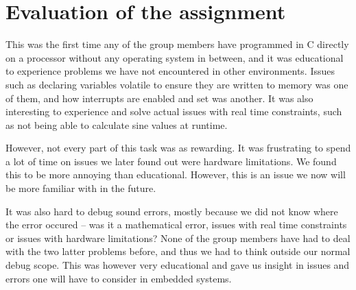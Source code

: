 \section{Evaluation of the assignment}

This was the first time any of the group members have programmed in C
directly on a processor without any operating system in between, and it
was educational to experience problems we have not encountered in other
environments.  Issues such as declaring variables volatile to ensure they
are written to memory was one of them, and how interrupts are enabled
and set was another. It was also interesting to experience and solve
actual issues with real time constraints, such as not being able to
calculate sine values at runtime.

However, not every part of this task was as rewarding. It was
frustrating to spend a lot of time on issues we later found out were
hardware limitations. We found this to be more annoying than
educational. However, this is an issue we now will be more familiar with
in the future.

It was also hard to debug sound errors, mostly because we did not know
where the error occured -- was it a mathematical error, issues with real
time constraints or issues with hardware limitations? None of the group
members have had to deal with the two latter problems before, and thus
we had to think outside our normal debug scope. This was however very
educational and gave us insight in issues and errors one will have to
consider in embedded systems.
